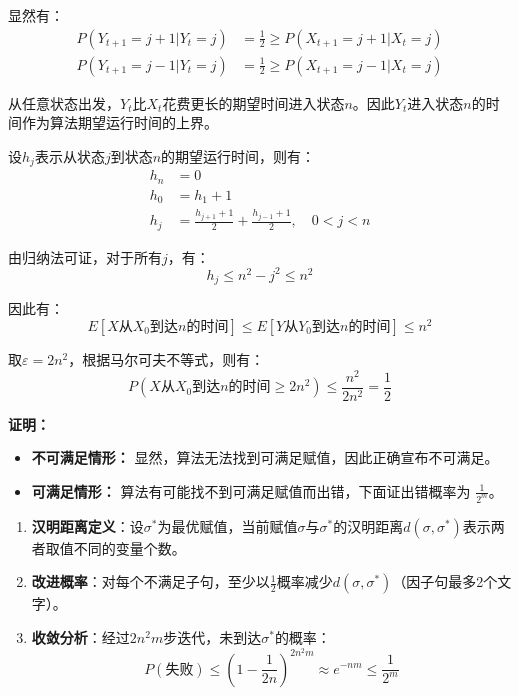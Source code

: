 \documentclass[./../main.tex]{subfiles} %
\begin{document}
显然有：
\begin{align*}
P(Y_{t+1}=j+1|Y_t=j) &= \frac{1}{2} \geq P(X_{t+1}=j+1|X_t=j) \\
P(Y_{t+1}=j-1|Y_t=j) &= \frac{1}{2} \geq P(X_{t+1}=j-1|X_t=j)
\end{align*}

从任意状态出发，$Y_t$比$X_t$花费更长的期望时间进入状态$n$。因此$Y_t$进入状态$n$的时间作为算法期望运行时间的上界。

设$h_j$表示从状态$j$到状态$n$的期望运行时间，则有：
\begin{align*}
h_n &= 0 \\
h_0 &= h_1 + 1 \\
h_j &= \frac{h_{j+1}+1}{2} + \frac{h_{j-1}+1}{2}, \quad 0 < j < n
\end{align*}

由归纳法可证，对于所有$j$，有：
$$
h_j \leq n^2 - j^2 \leq n^2
$$

因此有：
$$
E[\text{$X$从$X_0$到达$n$的时间}] \leq E[\text{$Y$从$Y_0$到达$n$的时间}] \leq n^2
$$

取$\varepsilon = 2n^2$，根据马尔可夫不等式，则有：
$$
P(\text{$X$从$X_0$到达$n$的时间} \geq 2n^2) \leq \frac{n^2}{2n^2} = \frac{1}{2}
$$

\noindent\textbf{证明：}
\begin{itemize}
    \item[$\bullet$] \textbf{不可满足情形：} 显然，算法无法找到可满足赋值，因此正确宣布不可满足。
    
    \item[$\bullet$] \textbf{可满足情形：} 算法有可能找不到可满足赋值而出错，下面证出错概率为 $\frac{1}{2^m}$。
\end{itemize}

    
\begin{enumerate}
    \item \textbf{汉明距离定义}：设$\sigma^*$为最优赋值，当前赋值$\sigma$与$\sigma^*$的汉明距离$d(\sigma,\sigma^*)$表示两者取值不同的变量个数。
    
    \item \textbf{改进概率}：对每个不满足子句，至少以$\frac{1}{2}$概率减少$d(\sigma,\sigma^*)$（因子句最多2个文字）。
    
    \item \textbf{收敛分析}：经过$2n^2m$步迭代，未到达$\sigma^*$的概率：
    $$
    P(\text{失败}) \leq \left(1-\frac{1}{2n}\right)^{2n^2m} \approx e^{-nm} \leq \frac{1}{2^m}
    $$
\end{enumerate}
\end{document}
